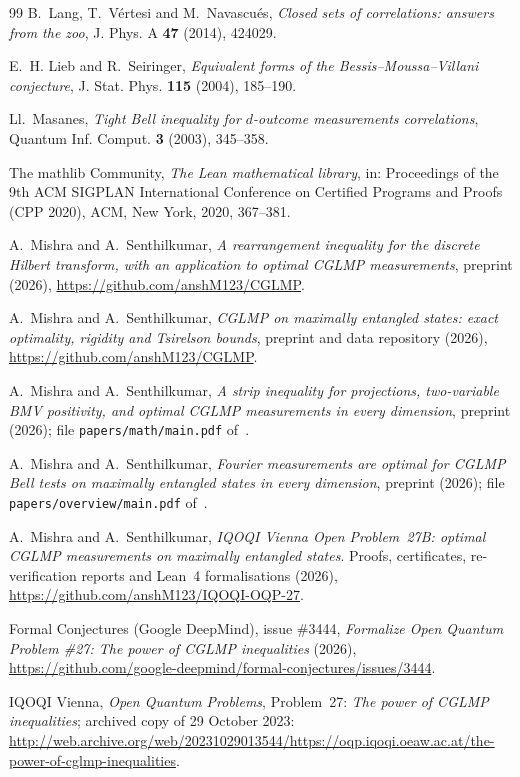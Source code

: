\documentclass[11pt]{article}
\theoremstyle{remark}
\numberwithin{equation}{section}
\begin{document}
\begin{thebibliography}{99}
B.~Lang, T.~V\'ertesi and M.~Navascu\'es, \emph{Closed sets of correlations: answers from the zoo}, J. Phys. A
\textbf{47} (2014), 424029.

E.~H. Lieb and R.~Seiringer, \emph{Equivalent forms of the Bessis--Moussa--Villani conjecture}, J. Stat. Phys.
\textbf{115} (2004), 185--190.

Ll.~Masanes, \emph{Tight Bell inequality for $d$-outcome measurements correlations}, Quantum Inf. Comput. \textbf{3}
(2003), 345--358.

The mathlib Community, \emph{The Lean mathematical library}, in: Proceedings of the 9th ACM SIGPLAN International
Conference on Certified Programs and Proofs (CPP 2020), ACM, New York, 2020, 367--381.

A.~Mishra and A.~Senthilkumar, \emph{A rearrangement inequality for the discrete Hilbert transform, with an application
to optimal CGLMP measurements}, preprint (2026), \url{https://github.com/anshM123/CGLMP}.

A.~Mishra and A.~Senthilkumar, \emph{CGLMP on maximally entangled states: exact optimality, rigidity and Tsirelson
bounds}, preprint and data repository (2026), \url{https://github.com/anshM123/CGLMP}.

A.~Mishra and A.~Senthilkumar, \emph{A strip inequality for projections, two-variable BMV positivity, and optimal CGLMP
measurements in every dimension}, preprint (2026); file \texttt{papers/math/main.pdf} of~\cite{repo}.

A.~Mishra and A.~Senthilkumar, \emph{Fourier measurements are optimal for CGLMP Bell tests on maximally entangled
states in every dimension}, preprint (2026); file \texttt{papers/overview/main.pdf} of~\cite{repo}.

A.~Mishra and A.~Senthilkumar, \emph{IQOQI Vienna Open Problem~27B: optimal CGLMP measurements on maximally entangled
states}. Proofs, certificates, re-verification reports and Lean~4 formalisations (2026),
\url{https://github.com/anshM123/IQOQI-OQP-27}.

Formal Conjectures (Google DeepMind), issue \#3444, \emph{Formalize Open Quantum Problem \#27: The power of CGLMP
inequalities} (2026), \url{https://github.com/google-deepmind/formal-conjectures/issues/3444}.

IQOQI Vienna, \emph{Open Quantum Problems}, Problem~27: \emph{The power of CGLMP inequalities}; archived copy of 29
October 2023:
\url{http://web.archive.org/web/20231029013544/https://oqp.iqoqi.oeaw.ac.at/the-power-of-cglmp-inequalities}.


\end{thebibliography}
\end{document}
